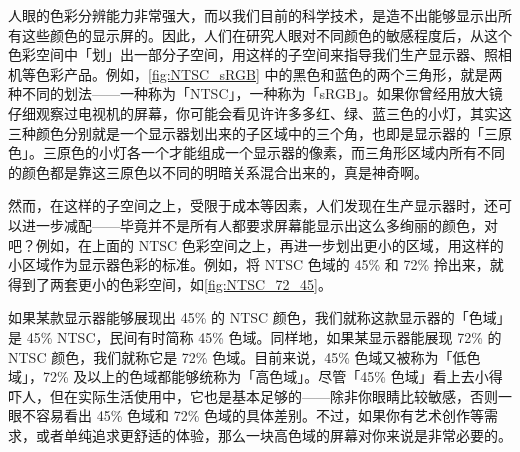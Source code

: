 人眼的色彩分辨能力非常强大，而以我们目前的科学技术，是造不出能够显示出所有这些颜色的显示屏的。因此，人们在研究人眼对不同颜色的敏感程度后，从这个色彩空间中「划」出一部分子空间，用这样的子空间来指导我们生产显示器、照相机等色彩产品。例如，\autoref{fig:NTSC_sRGB} 中的黑色和蓝色的两个三角形，就是两种不同的划法——一种称为「NTSC」，一种称为「sRGB」。如果你曾经用放大镜仔细观察过电视机的屏幕，你可能会看见许许多多红、绿、蓝三色的小灯，其实这三种颜色分别就是一个显示器划出来的子区域中的三个角，也即是显示器的「三原色」。三原色的小灯各一个才能组成一个显示器的像素，而三角形区域内所有不同的颜色都是靠这三原色以不同的明暗关系混合出来的，真是神奇啊。

然而，在这样的子空间之上，受限于成本等因素，人们发现在生产显示器时，还可以进一步减配——毕竟并不是所有人都要求屏幕能显示出这么多绚丽的颜色，对吧？例如，在上面的 NTSC 色彩空间之上，再进一步划出更小的区域，用这样的小区域作为显示器色彩的标准。例如，将 NTSC 色域的 45\% 和 72\% 拎出来，就得到了两套更小的色彩空间，如\autoref{fig:NTSC_72_45}。

如果某款显示器能够展现出 45\% 的 NTSC 颜色，我们就称这款显示器的「色域」是 45\% NTSC，民间有时简称 45\% 色域。同样地，如果某显示器能展现 72\% 的 NTSC 颜色，我们就称它是 72\% 色域。目前来说，45\% 色域又被称为「低色域」，72\% 及以上的色域都能够统称为「高色域」。尽管「45\% 色域」看上去小得吓人，但在实际生活使用中，它也是基本足够的——除非你眼睛比较敏感，否则一眼不容易看出 45\% 色域和 72\% 色域的具体差别。不过，如果你有艺术创作等需求，或者单纯追求更舒适的体验，那么一块高色域的屏幕对你来说是非常必要的。

